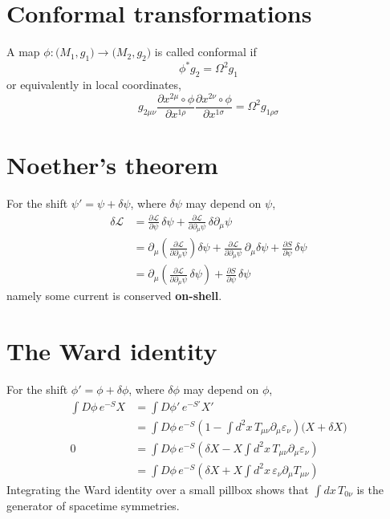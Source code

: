 \documentclass[12pt, oneside]{book}
\begin{document}
\section*{Conformal transformations}
A map $\phi:\big(M_1,g_1\big)\to\big(M_2,g_2\big)$ is called conformal if
\[
\phi^*g_2=\Omega^2g_1
\]
or equivalently in local coordinates,
\[
g_{2\mu\nu}\frac{\partial x^{2\mu}\circ\phi}{\partial x^{1\rho}}\frac{\partial x^{2\nu}\circ\phi}{\partial x^{1\sigma}}=\Omega^2g_{1\rho\sigma}
\]

\section*{Noether's theorem}
For the shift $\psi'=\psi+\delta\psi$, where $\delta\psi$ may depend on $\psi$,
\begin{align*}
\delta\mathcal{L}
&=\frac{\partial\mathcal{L}}{\partial\psi}\,\delta\psi+\frac{\partial\mathcal{L}}{\partial\partial_{\mu}\psi}\,\delta\partial_{\mu}\psi\\
&=\partial_{\mu}\left(\frac{\partial\mathcal{L}}{\partial\partial_{\mu}\psi}\right)\delta\psi+\frac{\partial\mathcal{L}}{\partial\partial_{\mu}\psi}\,\partial_{\mu}\delta\psi+\frac{\partial S}{\partial\psi}\,\delta\psi\\
&=\partial_{\mu}\left(\frac{\partial\mathcal{L}}{\partial\partial_{\mu}\psi}\,\delta\psi\right)+\frac{\partial S}{\partial\psi}\,\delta\psi
\end{align*}
namely some current is conserved \textbf{on-shell}.

\section*{The Ward identity}
For the shift $\phi'=\phi+\delta\phi$, where $\delta\phi$ may depend on $\phi$,
\begin{align*}
\int D\phi\,e^{-S}X
&=\int D\phi'\,e^{-S'}X'\\
&=\int D\phi\,e^{-S}\left(1-\int d^2x\,T_{\mu\nu}\partial_{\mu}\varepsilon_{\nu}\right)\big(X+\delta X\big)\\[10pt]
0
&=\int D\phi\,e^{-S}\left(\delta X-X\int d^2x\,T_{\mu\nu}\partial_{\mu}\varepsilon_{\nu}\right)\\
&=\int D\phi\,e^{-S}\left(\delta X+X\int d^2x\,\varepsilon_{\nu}\partial_{\mu}T_{\mu\nu}\right)
\end{align*}
Integrating the Ward identity over a small pillbox shows that $\int dx\,T_{0\nu}$ is the generator of spacetime symmetries.
\end{document}

